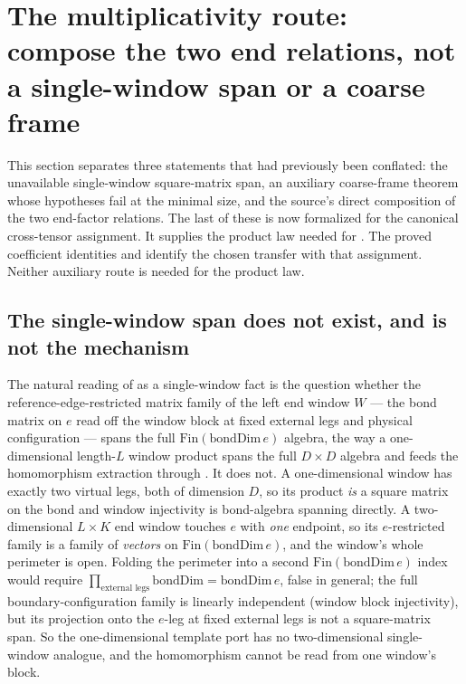 \documentclass{article}
\begin{document}
\section{The multiplicativity route: compose the two end relations, not a
  single-window span or a coarse frame}

This section separates three statements that had previously been conflated:
the unavailable single-window square-matrix span, an auxiliary coarse-frame
theorem whose hypotheses fail at the minimal size, and the source's direct
composition of the two end-factor relations.  The last of these is now
formalized for the canonical cross-tensor assignment.  It supplies the product
law needed for . The proved coefficient identities and
identify the chosen transfer with that assignment. Neither auxiliary route
is needed for the product law.

\subsection{The single-window span does not exist, and is not the mechanism}

The natural reading of  as a single-window fact is the question whether
the reference-edge-restricted matrix family of the left end window $W$ --- the bond
matrix on $e$ read off the window block at fixed external legs and physical
configuration --- spans the full $\mathrm{Fin}(\mathrm{bondDim}\,e)$ algebra, the way
a one-dimensional length-$L$ window product spans the full $D\times D$ algebra and
feeds the homomorphism extraction  through
. It does not. A one-dimensional window has exactly
two virtual legs, both of dimension $D$, so its product \emph{is} a square matrix on
the bond and window injectivity is bond-algebra spanning directly. A two-dimensional
$L\times K$ end window touches $e$ with \emph{one} endpoint, so its $e$-restricted
family is a family of \emph{vectors} on $\mathrm{Fin}(\mathrm{bondDim}\,e)$, and the
window's whole perimeter is open. Folding the perimeter into a second
$\mathrm{Fin}(\mathrm{bondDim}\,e)$ index would require
$\prod_{\text{external legs}}\mathrm{bondDim} = \mathrm{bondDim}\,e$, false in
general; the full boundary-configuration family is linearly independent (window block
injectivity), but its projection onto the $e$-leg at fixed external legs is not a
square-matrix span. So the one-dimensional template port has no two-dimensional
single-window analogue, and the homomorphism cannot be read from one window's block.
\end{document}
